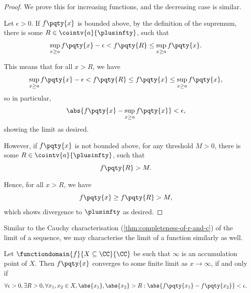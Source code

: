 \begin{proof}
    We prove this for increasing functions, and the decreasing case is similar.

    Let \(\epsilon > 0\). If \(f\pqty{x}\) is bounded above, by the definition of the supremum, there is some \(R \in \cointv{a}{\plusinfty}\), such that
    \[
        \sup_{x \geq a} f\pqty{x} - \epsilon < f\pqty{R} \leq \sup_{x \geq a} f\pqty{x}.
    \]

    This means that for all \(x > R\), we have
    \[
        \sup_{x \geq a} f\pqty{x} - \epsilon < f\pqty{R} \leq f\pqty{x} \leq \sup_{x \geq a} f\pqty{x},
    \]
    so in particular,
    \[
        \abs{f\pqty{x} - \sup_{x \geq a} f\pqty{x}} < \epsilon,
    \]
    showing the limit as desired.

    However, if \(f\pqty{x}\) is not bounded above, for any threshold \(M > 0\), there is some \(R \in \cointv{a}{\plusinfty}\), such that
    \[
        f\pqty{R} > M.
    \]

    Hence, for all \(x > R\), we have
    \[
        f\pqty{x} \geq f\pqty{R} > M,
    \]
    which shows divergence to \(\plusinfty\) as desired.
\end{proof}

Similar to the Cauchy characterisation (\autoref{thm:completeness-of-r-and-c}) of the limit of a sequence, we may characterise the limit of a function similarly as well.

\begin{proposition}
    \label{prop:cauchy-criteria-funciton-limit-infinity}%
    Let \(\functiondomain{f}{X \subseteq \CC}{\CC}\) be such that \(\infty\) is an accumulation point of \(X\). Then \(f\pqty{x}\) converges to some finite limit as \(x \to \infty\), if and only if
    \[
        \forall \epsilon > 0, \exists R > 0, \forall x_1, x_2 \in X, \abs{x_1}, \abs{x_2} > R: \abs{f\pqty{x_1} - f\pqty{x_2}} < \epsilon.
    \]
\end{proposition}

